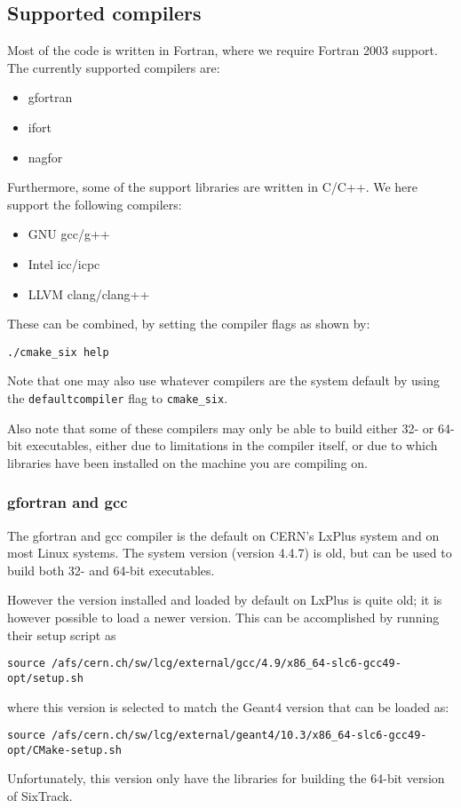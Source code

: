 \documentclass[english,BCOR=0mm,DIV=18]{scrartcl}
\begin{document}
\subsection{Supported compilers}
Most of the code is written in Fortran, where we require Fortran 2003 support.
The currently supported compilers are:
\begin{itemize}
\item gfortran
\item ifort
\item nagfor
\end{itemize}
Furthermore, some of the support libraries are written in C/C++.
We here support the following compilers:
\begin{itemize}
\item GNU gcc/g++
\item Intel icc/icpc
\item LLVM clang/clang++
\end{itemize}
These can be combined, by setting the compiler flags as shown by:
\begin{lstlisting}
./cmake_six help
\end{lstlisting}
Note that one may also use whatever compilers are the system default by using the \texttt{defaultcompiler} flag to \texttt{cmake\_six}.

Also note that some of these compilers may only be able to build either 32- or 64-bit executables, either due to limitations in the compiler itself, or due to which libraries have been installed on the machine you are compiling on.

\subsubsection{gfortran and gcc}
The gfortran and gcc compiler is the default on CERN's LxPlus system and on most Linux systems.
The system version (version 4.4.7) is old, but can be used to build both 32- and 64-bit executables.

However the version installed and loaded by default on LxPlus is quite old; it is however possible to load a newer version.
This can be accomplished by running their setup script as
\begin{lstlisting}
source /afs/cern.ch/sw/lcg/external/gcc/4.9/x86_64-slc6-gcc49-opt/setup.sh
\end{lstlisting}
where this version is selected to match the Geant4 version that can be loaded as:
\begin{lstlisting}
source /afs/cern.ch/sw/lcg/external/geant4/10.3/x86_64-slc6-gcc49-opt/CMake-setup.sh
\end{lstlisting}
Unfortunately, this version only have the libraries for building the 64-bit version of SixTrack.
\end{document}

